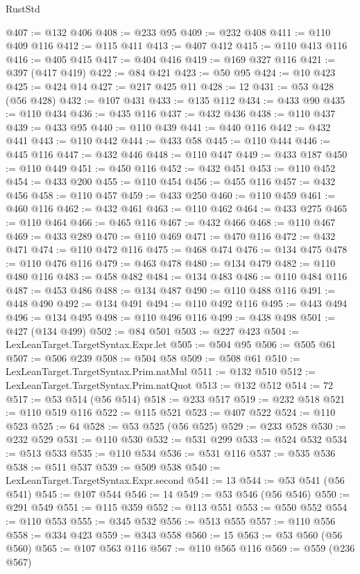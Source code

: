 \begin{lexlean}{RustStd}
\begin{coremodule}
{\begin{coremodule}
{{{{{{{{{{{{{{{{{{{{{{{{{{{{{{{{{{{{{{{{{{{{{{{@407 := @132 @406
@408 := @233 @95
@409 := @232 @408
@411 := @110 @409 @116
@412 := @115 @411
@413 := @407 @412
@415 := @110 @413 @116
@416 := @405 @415
@417 := @404 @416
@419 := @169 @327 @116
@421 := @397 (@417 @419)
@422 := @84 @421
@423 := @50 @95
@424 := @10 @423
@425 := @424 @14
@427 := @217 @425 @11
@428 := 12
@431 := @53 @428 (@56 @428)
@432 := @107 @431
@433 := @135 @112
@434 := @433 @90
@435 := @110 @434
@436 := @435 @116
@437 := @432 @436
@438 := @110 @437
@439 := @433 @95
@440 := @110 @439
@441 := @440 @116
@442 := @432 @441
@443 := @110 @442
@444 := @433 @58
@445 := @110 @444
@446 := @445 @116
@447 := @432 @446
@448 := @110 @447
@449 := @433 @187
@450 := @110 @449
@451 := @450 @116
@452 := @432 @451
@453 := @110 @452
@454 := @433 @200
@455 := @110 @454
@456 := @455 @116
@457 := @432 @456
@458 := @110 @457
@459 := @433 @250
@460 := @110 @459
@461 := @460 @116
@462 := @432 @461
@463 := @110 @462
@464 := @433 @275
@465 := @110 @464
@466 := @465 @116
@467 := @432 @466
@468 := @110 @467
@469 := @433 @289
@470 := @110 @469
@471 := @470 @116
@472 := @432 @471
@474 := @110 @472 @116
@475 := @468 @474
@476 := @134 @475
@478 := @110 @476 @116
@479 := @463 @478
@480 := @134 @479
@482 := @110 @480 @116
@483 := @458 @482
@484 := @134 @483
@486 := @110 @484 @116
@487 := @453 @486
@488 := @134 @487
@490 := @110 @488 @116
@491 := @448 @490
@492 := @134 @491
@494 := @110 @492 @116
@495 := @443 @494
@496 := @134 @495
@498 := @110 @496 @116
@499 := @438 @498
@501 := @427 (@134 @499)
@502 := @84 @501
@503 := @227 @423
@504 := LexLeanTarget.TargetSyntax.Expr.let
@505 := @504 @95
@506 := @505 @61
@507 := @506 @239
@508 := @504 @58
@509 := @508 @61
@510 := LexLeanTarget.TargetSyntax.Prim.natMul
@511 := @132 @510
@512 := LexLeanTarget.TargetSyntax.Prim.natQuot
@513 := @132 @512
@514 := 72
@517 := @53 @514 (@56 @514)
@518 := @233 @517
@519 := @232 @518
@521 := @110 @519 @116
@522 := @115 @521
@523 := @407 @522
@524 := @110 @523
@525 := 64
@528 := @53 @525 (@56 @525)
@529 := @233 @528
@530 := @232 @529
@531 := @110 @530
@532 := @531 @299
@533 := @524 @532
@534 := @513 @533
@535 := @110 @534
@536 := @531 @116
@537 := @535 @536
@538 := @511 @537
@539 := @509 @538
@540 := LexLeanTarget.TargetSyntax.Expr.second
@541 := 13
@544 := @53 @541 (@56 @541)
@545 := @107 @544
@546 := 14
@549 := @53 @546 (@56 @546)
@550 := @291 @549
@551 := @115 @359
@552 := @113 @551
@553 := @550 @552
@554 := @110 @553
@555 := @345 @532
@556 := @513 @555
@557 := @110 @556
@558 := @334 @423
@559 := @343 @558
@560 := 15
@563 := @53 @560 (@56 @560)
@565 := @107 @563 @116
@567 := @110 @565 @116
@569 := @559 (@236 @567)
}}}}}}}}}}}}}}}}}}}}}}}}}}}}}}}}}}}}}}}}}}}}}}}
\end{coremodule}}
\end{coremodule}
\end{lexlean}

